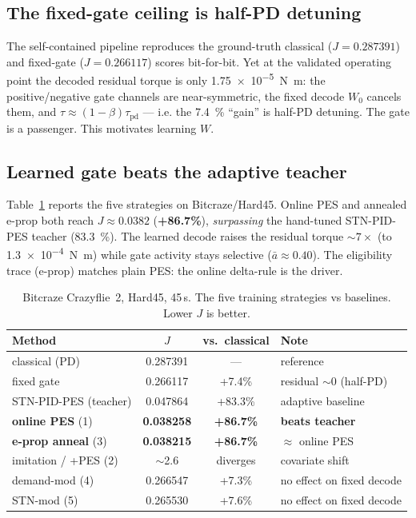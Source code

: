 \documentclass[conference]{IEEEtran}
\newcommand{\best}[1]{\textbf{#1}}
\begin{document}
\subsection{The fixed-gate ceiling is half-PD detuning}\label{sec:diag}
The self-contained pipeline reproduces the ground-truth classical
($J{=}0.287391$) and fixed-gate ($J{=}0.266117$) scores bit-for-bit. Yet at the
validated operating point the decoded residual torque is only
\SI{1.75e-5}{N.m}: the positive/negative gate channels are near-symmetric, the
fixed decode $W_0$ cancels them, and $\tau\!\approx\!(1{-}\beta)\tau_\mathrm{pd}$
--- i.e. the \SI{7.4}{\percent} ``gain'' is half-PD detuning. The gate is a
passenger. This motivates learning $W$.

\subsection{Learned gate beats the adaptive teacher}
Table~\ref{tab:primary} reports the five strategies on Bitcraze/Hard45. Online
PES and annealed e-prop both reach $J{\approx}0.0382$ (\best{+86.7\%}),
\emph{surpassing} the hand-tuned STN-PID-PES teacher (\SI{+83.3}{\percent}). The
learned decode raises the residual torque $\sim\!7\times$ (to
\SI{1.3e-4}{N.m}) while gate activity stays selective ($\bar a\!\approx\!0.40$).
The eligibility trace (e-prop) matches plain PES: the online delta-rule is the
driver.

\begin{table}[t]
\caption{Bitcraze Crazyflie~2, Hard45, 45\,s. The five training strategies vs
baselines. Lower $J$ is better.}
\label{tab:primary}
\centering\small
\begin{tabular}{@{}lccl@{}}
\toprule
Method & $J$ & vs.\ classical & Note \\
\midrule
classical (PD)             & 0.287391 & ---        & reference \\
fixed gate                 & 0.266117 & +7.4\%     & residual $\sim0$ (half-PD) \\
STN-PID-PES (teacher)      & 0.047864 & +83.3\%    & adaptive baseline \\
\best{online PES} (1)      & \best{0.038258} & \best{+86.7\%} & \best{beats teacher} \\
\best{e-prop anneal} (3)   & \best{0.038215} & \best{+86.7\%} & $\approx$ online PES \\
imitation / +PES (2)       & $\sim$2.6 & diverges   & covariate shift \\
demand-mod (4)             & 0.266547 & +7.3\%     & no effect on fixed decode \\
STN-mod (5)                & 0.265530 & +7.6\%     & no effect on fixed decode \\
\bottomrule
\end{tabular}
\end{table}
\end{document}
